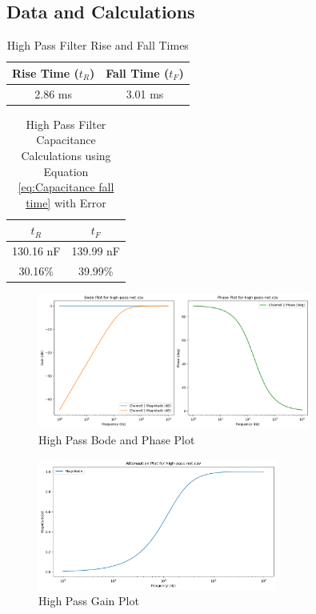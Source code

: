 \documentclass{article}
\begin{document}
\subsection{Data and Calculations}
\begin{table}[h!]
    \centering
    \begin{tabular}{|c|c|}
        \hline
        Rise Time ($t_R$) & Fall Time ($t_F$) \\
        \hline
        2.86 ms & 3.01 ms\\
        \hline
    \end{tabular}
    \caption{High Pass Filter Rise and Fall Times}
    \label{tab:High Pass Filter Times}
\end{table}
\begin{table}[h!]
    \centering
    \begin{tabular}{|c|c|}
        \hline
        $t_R$ & $t_F$\\
        \hline
        130.16 nF & 139.99 nF\\
        \hline
        30.16\% & 39.99\%\\
        \hline
    \end{tabular}
    \caption{High Pass Filter Capacitance Calculations using Equation \ref{eq:Capacitance fall time} with Error}
    \label{tab:High Pass Filter Capacitance Calculations}
\end{table}
\begin{figure}[h!]
    \centering
    \includegraphics[width=0.8\textwidth]{Images/high-pass-bode.png}
    \caption{High Pass Bode and Phase Plot}
    \label{fig:High Pass Bode Plot}
\end{figure}
\begin{figure}[H]
    \centering
    \includegraphics[width=0.7\textwidth]{Images/high-pass-gain.png}
    \caption{High Pass Gain Plot}
    \label{fig:High Pass Gain Plot}
\end{figure}
\end{document}
